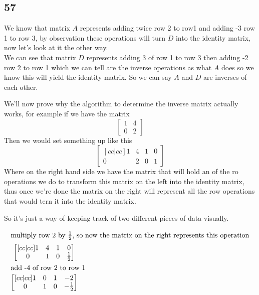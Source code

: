 \documentclass[11pt]{book}
\begin{document}

\subsection{57}%
\label{sub:57}

We know that matrix $A$ represents adding twice row 2 to row1 and adding -3 row 1 to row 3, by observation these operations will turn $D$ into the identity matrix, now let's look at it the other way.\\
We can see that matrix $D$ represents adding 3 of row 1 to row 3 then adding -2 row 2 to row 1 which we can tell are the inverse operations as what $A$ does so we know this will yield the identity matrix. So we can say $A$ and $D$ are inverses of each other.




We'll now prove why the algorithm to determine the inverse matrix actually works, for example if we have the matrix 
\[
\begin{bmatrix}
    1 & 4 \\
    0 & 2 
\end{bmatrix}
\]
Then we would set something up like this
\[
\begin{bmatrix}[cc|cc]
    1 & 4 & 1 & 0 \\
    0 & 2 & 0 & 1 
\end{bmatrix}
\]
Where on the right hand side we have the matrix that will hold an of the ro operations we do to transform this matrix on the left into the identity matrix, thus once we're done the matrix on the right will represent all the row operations that would tern it into the identity matrix.

So it's just a way of keeping track of two different pieces of data visually.

\begin{gather*}
    \intertext{multiply row 2 by $\frac{1}{2}$, so now the matrix on the right represents this operation}
    \begin{bmatrix}[c c | c c]
    	1 & 4 & 1 & 0 \\
    	0 & 1 & 0 & \frac{1}{2} 
    \end{bmatrix}\\
    \intertext{add -4 of row 2 to row 1}
    \begin{bmatrix}[c c | c c]
    	1 & 0 & 1 & -2 \\
    	0 & 1 & 0 & -\frac{1}{2} 
    \end{bmatrix}
\end{gather*}
\end{document}
